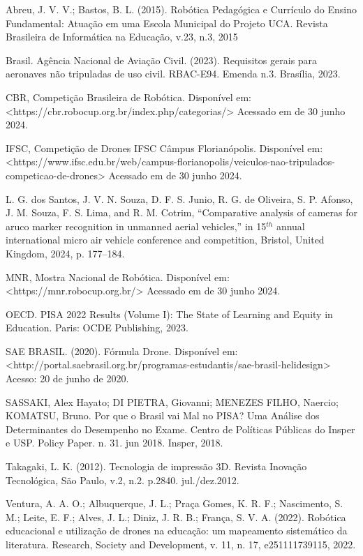 \documentclass[conference]{IEEEtran}
\begin{document}
\begin{thebibliography}{00}
     Abreu, J. V. V.; Bastos, B. L. (2015). Robótica Pedagógica e Currículo do Ensino Fundamental: Atuação em uma Escola Municipal do Projeto UCA. Revista Brasileira de Informática na Educação, v.23, n.3, 2015

     Brasil. Agência Nacional de Aviação Civil. (2023). Requisitos gerais para aeronaves não tripuladas de uso civil. RBAC-E94. Emenda n.3. Brasília, 2023.
    
     CBR, Competição Brasileira de Robótica. Disponível em: <https://cbr.robocup.org.br/index.php/categorias/> Acessado em de 30 junho 2024.
    
     IFSC, Competição de Drones IFSC Câmpus Florianópolis. Disponível em: <https://www.ifsc.edu.br/web/campus-florianopolis/veiculos-nao-tripulados-competicao-de-drones> Acessado em de 30 junho 2024.
    
     L. G. dos Santos, J. V. N. Souza, D. F. S. Junio, R. G. de Oliveira, S. P. Afonso, J. M. Souza, F. S. Lima, and R. M. Cotrim, “Comparative analysis of cameras for aruco marker recognition in unmanned aerial vehicles,” in 15$^{th}$ annual international micro air vehicle conference and competition, Bristol, United Kingdom, 2024, p. 177–184.
    
     MNR, Mostra Nacional de Robótica. Disponível em: <https://mnr.robocup.org.br/> Acessado em de 30 junho 2024.
    
     OECD. PISA 2022 Results (Volume I): The State of Learning and Equity in Education. Paris: OCDE Publishing, 2023.
    
     SAE BRASIL. (2020). Fórmula Drone. Disponível em: <http://portal.saebrasil.org.br/programas-estudantis/sae-brasil-helidesign> Acesso: 20 de junho de 2020.
    
     SASSAKI, Alex Hayato; DI PIETRA, Giovanni; MENEZES FILHO, Naercio; KOMATSU, Bruno. Por que o Brasil vai Mal no PISA? Uma Análise dos Determinantes do Desempenho no Exame. Centro de Políticas Públicas do Insper e USP. Policy Paper. n. 31. jun 2018. Insper, 2018. 
    
     Takagaki, L. K. (2012). Tecnologia de impressão 3D. Revista Inovação Tecnológica, São Paulo, v.2, n.2. p.2840. jul./dez.2012. 
    
     Ventura, A. A. O.; Albuquerque, J. L.; Praça Gomes, K. R. F.; Nascimento, S. M.; Leite, E. F.; Alves, J. L.; Diniz, J. R. B.; França, S. V. A. (2022). Robótica educacional e utilização de drones na educação: um mapeamento sistemático da literatura. Research, Society and Development, v. 11, n. 17, e251111739115, 2022.
    

\end{thebibliography}
\end{document}
